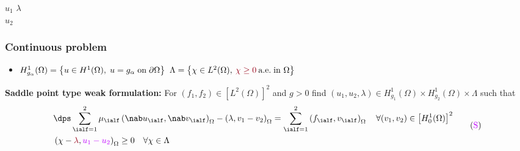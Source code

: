 \begin{frame}
\begin{figure}
\begin{subfigure}[normal]{0.44\textwidth}
\end{subfigure}
\end{figure}
\vspace*{-4.4cm}\hspace*{1.5 cm}$u_1$ \hspace{8 cm} $\lambda$\\
\vspace*{0.7cm}\hspace*{1.5 cm}$u_2$\\
\end{frame}
\begin{frame}
\frametitle{Continuous problem}
\begin{itemize}
\item $H_{g_{\alpha}}^1(\Omega) =  \left\{u\in H^1(\Omega), \hspace{0.1 cm} u=g_{\alpha} \hspace{0.1 cm} \mbox{on} \hspace{0.1 cm} \partial \Omega\right\}$ \quad $\Lambda=\left\{\chi\in L^2(\Omega), \: \textcolor{carmine}{\chi \geq 0} \: \mbox{a.e.} \hspace{0.1 cm} \mbox{in} \ \Omega\right\}$
\end{itemize}
\textbf{Saddle point type weak formulation:}
For $(f_1,f_2)\in \left[L^2(\Omega)\right]^2$ and $g > 0$ find $(u_1,u_2,\lambda)\in H_{g_1}^1(\Omega) \times H_{g_2}^1(\Omega) \times \Lambda$ such that
\begin{equation*}
\begin{split}
& \dps \sum_{\ialf=1}^2 \mu_\ialf \left(\nab u_\ialf,\nab v_\ialf\right)_{\Omega} - \left(\lambda,v_1-v_2\right)_{\Omega} = \sum_{\ialf=1}^2\left(f_\ialf,v_\ialf\right)_{\Omega} \quad \forall (v_1,v_2) \in \left[H_0^1(\Omega)\right]^2 \\
& \left(\chi - \textcolor{carmine}{\lambda},\textcolor{electricpurple}{u_1-u_2}\right)_{\Omega} \geq 0 
\quad \forall \chi \in \Lambda 
\end{split}
 \tag{$\textcolor{electricpurple}{\mathrm{S}}$}
\end{equation*}
\end{frame}
